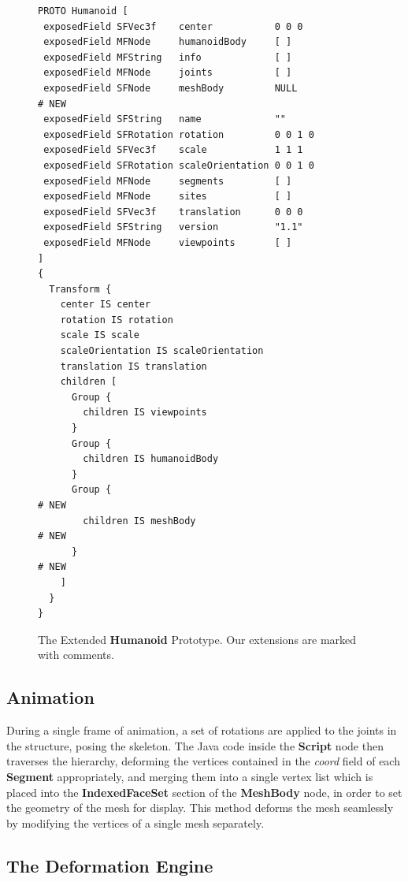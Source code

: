 \begin{figure}[t]
\renewcommand{\baselinestretch}{1}
\scriptsize
\begin{verbatim}
PROTO Humanoid [
 exposedField SFVec3f    center           0 0 0
 exposedField MFNode     humanoidBody     [ ]
 exposedField MFString   info             [ ]
 exposedField MFNode     joints           [ ]
 exposedField SFNode     meshBody         NULL              # NEW
 exposedField SFString   name             ""
 exposedField SFRotation rotation         0 0 1 0
 exposedField SFVec3f    scale            1 1 1
 exposedField SFRotation scaleOrientation 0 0 1 0
 exposedField MFNode     segments         [ ]
 exposedField MFNode     sites            [ ]
 exposedField SFVec3f    translation      0 0 0
 exposedField SFString   version          "1.1"
 exposedField MFNode     viewpoints       [ ]
]
{
  Transform {
    center IS center
    rotation IS rotation
    scale IS scale
    scaleOrientation IS scaleOrientation
    translation IS translation
    children [
      Group {
        children IS viewpoints
      }
      Group {
        children IS humanoidBody
      }
      Group {                                               # NEW
        children IS meshBody                                # NEW
      }                                                     # NEW
    ]
  }
}
\end{verbatim}
\caption[The Extended Humanoid Prototype.]{\label{fig:humanoidproto} The Extended {\bf Humanoid} Prototype. Our extensions are marked with comments.}
\end{figure}

\subsection{\label{sec:skeletalanim:vrml:animation}Animation}
During a single frame of animation, a set of rotations are applied to the joints in the structure, posing the skeleton. The Java code inside the {\bf Script} node then traverses the hierarchy, deforming the vertices contained in the {\it coord} field of each {\bf Segment} appropriately, and merging them into a single vertex list which is placed into the {\bf IndexedFaceSet} section of the {\bf MeshBody} node, in order to set the geometry of the mesh for display. This method deforms the mesh seamlessly by modifying the vertices of a single mesh separately.

\subsection{\label{sec:skeletalanim:vrml:engine}The Deformation Engine}

